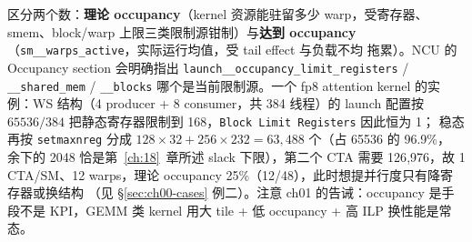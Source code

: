 区分两个数：\textbf{理论 occupancy}（kernel 资源能驻留多少 warp，受寄存器、
smem、block/warp 上限三类限制源钳制）与\textbf{达到 occupancy}
（\texttt{sm\_\allowbreak{}\_\allowbreak{}warps\_\allowbreak{}active}，实际运行均值，受 tail effect 与负载不均
拖累）。NCU 的 Occupancy section 会明确指出 \texttt{launch\_\allowbreak{}\_\allowbreak{}occupancy\_\allowbreak{}limit\_\allowbreak{}registers} /
\texttt{\_\allowbreak{}\_\allowbreak{}shared\_\allowbreak{}mem} / \texttt{\_\_blocks} 哪个是当前限制源。一个
fp8 attention kernel 的实例：WS 结构（4 producer + 8 consumer，共 384 线程）的
launch 配置按 $65536/384$ 把静态寄存器限制到 168，\texttt{Block Limit Registers} 因此恒为 1；
稳态再按 \texttt{setmaxnreg} 分成 $128\times32 + 256\times232 = 63{,}488$ 个（占 65536 的 96.9\%，
余下的 2048 恰是第~\ref{ch:18}~章所述 slack 下限），第二个 CTA 需要 126{,}976，故
1 CTA/SM、12 warps，理论 occupancy
25\%（12/48），此时想提并行度只有降寄存器或换结构
（见 \S\ref{sec:ch00-cases} 例二）。注意 ch01 的告诫：occupancy 是手段不是
KPI，GEMM 类 kernel 用大 tile + 低 occupancy + 高 ILP 换性能是常态。

